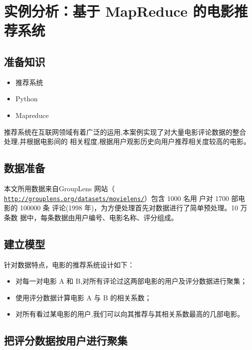 \section{实例分析：基于 MapReduce
的电影推荐系统}\label{ux5b9eux4f8bux5206ux6790ux57faux4e8e-mapreduce-ux7684ux7535ux5f71ux63a8ux8350ux7cfbux7edf}

\subsection{准备知识}\label{ux51c6ux5907ux77e5ux8bc6}

\begin{itemize}
\itemsep1pt\parskip0pt
\item
  推荐系统
\item
  Python
\item
  Mapreduce
\end{itemize}

推荐系统在互联网领域有着广泛的运用,本案例实现了对大量电影评论数据的整合处理,并根据电影间的
相关程度,根据用户观影历史向用户推荐相关度较高的电影。

\subsection{数据准备}\label{ux6570ux636eux51c6ux5907}

本文所用数据来自GroupLens 网站（
\href{http://grouplens.org/datasets/movielens/}{\lstinline|http://grouplens.org/datasets/movielens/|}）包含
1000 名用 户对 1700 部电影的 100000 条 评论(1998
年)，为方便处理首先对数据进行了简单预处理。10 万条数
据中，每条数据由用户编号、电影名称、评分组成。

\subsection{建立模型}\label{ux5efaux7acbux6a21ux578b}

针对数据特点，电影的推荐系统设计如下：

\begin{itemize}
\item
  对每一对电影 A 和 B,对所有评论过这两部电影的用户及评分数据进行聚集；
\item
  使用评分数据计算电影 A 与 B 的相关系数；
\item
  对所有看过某电影的用户,我们可以向其推荐与其相关系数最高的几部电影。
\end{itemize}


\subsection{把评分数据按用户进行聚集}\label{ux628aux8bc4ux5206ux6570ux636eux6309ux7528ux6237ux8fdbux884cux805aux96c6}

